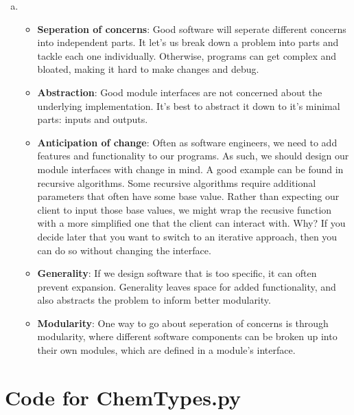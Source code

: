 \documentclass[12pt]{article}
\begin{document}
\begin{enumerate}[a)]
\item
\begin{itemize}[\label{}]
    \item \textbf{Seperation of concerns}: Good software will seperate different concerns into independent parts. It let's us break down a problem into parts and tackle each one individually. Otherwise, programs can get complex and bloated, making it hard to make changes and debug.
    \item \textbf{Abstraction}: Good module interfaces are not concerned about the underlying implementation. It's best to abstract it down to it's minimal parts: inputs and outputs.
    \item \textbf{Anticipation of change}: Often as software engineers, we need to add features and functionality to our programs. As such, we should design our module interfaces with change in mind. A good example can be found in recursive algorithms. Some recursive algorithms require additional parameters that often have some base value. Rather than expecting our client to input those base values, we might wrap the recusive function with a more simplified one that the client can interact with. Why? If you decide later that you want to switch to an iterative approach, then you can do so without changing the interface.
    \item \textbf{Generality}: If we design software that is too specific, it can often prevent expansion. Generality leaves space for added functionality, and also abstracts the problem to inform better modularity.
    \item \textbf{Modularity}: One way to go about seperation of concerns is through modularity, where different software components can be broken up into their own modules, which are defined in a module's interface.
\end{itemize}

\end{enumerate}


\newpage

\lstset{language=Python, basicstyle=\tiny, breaklines=true, showspaces=false,
  showstringspaces=false, breakatwhitespace=true}

\def\thesection{\Alph{section}}

\section{Code for ChemTypes.py}
\end{document}
